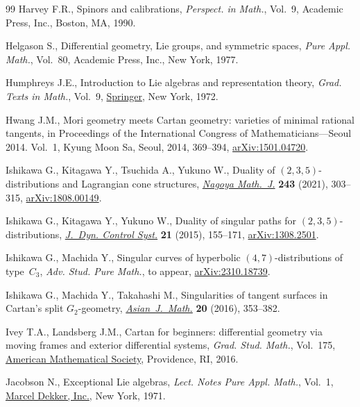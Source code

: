 \documentclass[pdftex]{sigma}
\numberwithin{equation}{section}
\theoremstyle{definition}
\newcommand{\0}{\boldsymbol{0}}
\begin{document}
\begin{thebibliography}{99}
Harvey F.R., Spinors and calibrations, \textit{Perspect. in Math.}, Vol.~9,
 Academic Press, Inc., Boston, MA, 1990.

Helgason S., Differential geometry, {L}ie groups, and symmetric spaces,
 \textit{Pure Appl. Math.}, Vol.~80, Academic Press, Inc., New York, 1977.

Humphreys J.E., Introduction to {L}ie algebras and representation theory,
 \textit{Grad. Texts in Math.}, Vol.~9,
 \href{https://doi.org/10.1007/978-1-4612-6398-2}{Springer}, New York, 1972.

Hwang J.M., Mori geometry meets {C}artan geometry: varieties of minimal
 rational tangents, in Proceedings of the {I}nternational {C}ongress of
 {M}athematicians---{S}eoul 2014. {V}ol.~1, Kyung Moon Sa, Seoul, 2014,
 369--394, \href{http://arxiv.org/abs/1501.04720}{arXiv:1501.04720}.

Ishikawa G., Kitagawa Y., Tsuchida A., Yukuno W., Duality of
 {$(2,3,5)$}-distributions and {L}agrangian cone structures,
 \href{https://doi.org/10.1017/nmj.2019.46}{\textit{Nagoya Math.~J.}}
 \textbf{243} (2021), 303--315,
 \href{http://arxiv.org/abs/1808.00149}{arXiv:1808.00149}.

Ishikawa G., Kitagawa Y., Yukuno W., Duality of singular paths for
 $(2,3,5)$-distributions,
 \href{https://doi.org/10.1007/s10883-014-9216-9}{\textit{J.~Dyn. Control
 Syst.}} \textbf{21} (2015), 155--171,
 \href{http://arxiv.org/abs/1308.2501}{arXiv:1308.2501}.

Ishikawa G., Machida Y., Singular curves of hyperbolic $(4,7)$-distributions of
 type~$C_3$, \textit{Adv. Stud. Pure Math.}, {t}o appear,
 \href{http://arxiv.org/abs/2310.18739}{arXiv:2310.18739}.

Ishikawa G., Machida Y., Takahashi M., Singularities of tangent surfaces in
 {C}artan's split {$G_2$}-geometry,
 \href{https://doi.org/10.4310/AJM.2016.v20.n2.a6}{\textit{Asian~J.~Math.}}
 \textbf{20} (2016), 353--382.

Ivey T.A., Landsberg J.M., Cartan for beginners: differential geometry via
 moving frames and exterior differential systems, \textit{Grad. Stud. Math.},
 Vol.~175, \href{https://doi.org/10.1090/gsm/175}{American Mathematical
 Society}, Providence, RI, 2016.

Jacobson N., Exceptional {L}ie algebras, \textit{Lect. Notes Pure Appl. Math.},
 Vol.~1, \href{https://doi.org/10.1201/9780203756478}{Marcel Dekker, Inc.}, New
 York, 1971.


\end{thebibliography}
\end{document}
